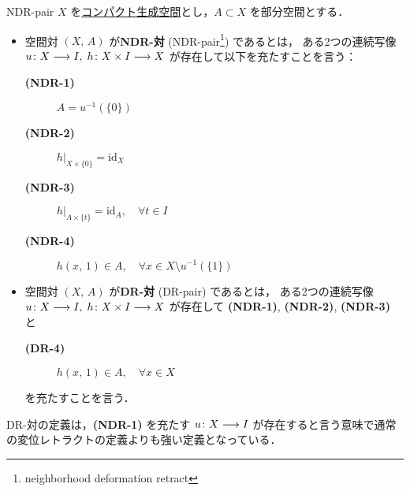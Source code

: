 \documentclass[algtopo_main]{subfiles}
\begin{document}
\begin{mydef}[label=def:NDR, breakable]{NDR-pair}
    $X$ を\underline{コンパクト生成空間}とし，$A \subset X$ を部分空間とする．
    \begin{itemize}
        \item 空間対 $(X,\, A)$ が\textbf{NDR-対} (NDR-pair\footnote{neighborhood deformation retract}) であるとは，
        ある2つの連続写像 $u \colon X \longrightarrow I,\; h \colon X \times I \longrightarrow X$ が存在して以下を充たすことを言う：
        \begin{description}
            \item[\textbf{(NDR-1)}] $A = u^{-1}(\{0\})$
            \item[\textbf{(NDR-2)}] $h|_{X \times \{0\}} = \mathrm{id}_X$
            \item[\textbf{(NDR-3)}] $h|_{A \times \{t\}} = \mathrm{id}_A,\quad \forall t \in I$
            \item[\textbf{(NDR-4)}] $h(x,\, 1) \in A, \quad \forall x \in X \setminus u^{-1} (\{1\}) $
        \end{description}
        \item 空間対 $(X,\, A)$ が\textbf{DR-対} (DR-pair) であるとは，
        ある2つの連続写像 $u \colon X \longrightarrow I,\; h \colon X \times I \longrightarrow X$ が存在して \textbf{\textsf{(NDR-1)}}, \textbf{\textsf{(NDR-2)}}, \textbf{\textsf{(NDR-3)}} と
        \begin{description}
            \item[\textbf{(DR-4)}] $h (x,\, 1) \in A,\quad  \forall x \in X$
        \end{description}
        を充たすことを言う．
    \end{itemize}
\end{mydef}

\begin{marker}
    DR-対の定義は，\textbf{\textsf{(NDR-1)}} を充たす $u \colon X \longrightarrow I$ が存在すると言う意味で通常の変位レトラクトの定義よりも強い定義となっている．
\end{marker}
\end{document}
